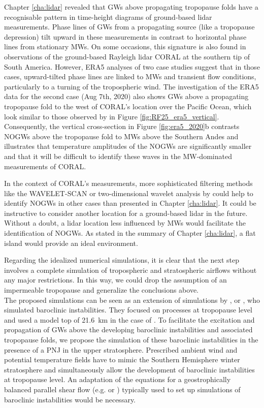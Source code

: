 Chapter \ref{cha:lidar} revealed that GWs above propagating tropopause folds have a recognisable pattern in time-height diagrams of ground-based lidar measurements. Phase lines of GWs from a propagating source (like a tropopause depression) tilt upward in these measurements in contrast to horizontal phase lines from stationary MWs. On some occasions, this signature is also found in observations of the ground-based Rayleigh lidar CORAL at the southern tip of South America. However, ERA5 analyses of two case studies suggest that in those cases, upward-tilted phase lines are linked to MWs and transient flow conditions, particularly to a turning of the tropospheric wind. The investigation of the ERA5 data for the second case (Aug 7th, 2020) also shows GWs above a propagating tropopause fold to the west of CORAL's location over the Pacific Ocean, which look similar to those observed by \textcite[]{dornbrack_stratospheric_2022} in Figure \ref{fig:RF25_era5_vertical}. Consequently, the vertical cross-section in Figure \ref{fig:era5_2020}b contrasts NOGWs above the tropopause fold to MWs above the Southern Andes and illustrates that temperature amplitudes of the NOGWs are significantly smaller and that it will be difficult to identify these waves in the MW-dominated measurements of CORAL.

In the context of CORAL's measurements, more sophisticated filtering methods like the WAVELET-SCAN or two-dimensional wavelet analysis by \textcite{reichert_highcadence_2021} could help to identify NOGWs in other cases than presented in Chapter \ref{cha:lidar}. It could be instructive to consider another location for a ground-based lidar in the future. Without a doubt, a lidar location less influenced by MWs would facilitate the identification of NOGWs. As stated in the summary of Chapter \ref{cha:lidar}, a flat island would provide an ideal environment.

Regarding the idealized numerical simulations, it is clear that the next step involves a complete simulation of tropospheric and stratospheric airflows without any major restrictions. In this way, we could drop the assumption of an impermeable tropopause and generalize the conclusions above.\\
The proposed simulations can be seen as an extension of simulations by \textcite{bush_tropopause_1994}, \textcite{zhang_generation_2004} or \textcite{menchaca_impact_2018}, who simulated baroclinic instabilities. They focused on processes at tropopause level and used a model top of \SI{21.6}{\kilo\meter} in the case of \textcite{zhang_generation_2004}. To facilitate the excitation and propagation of GWs above the developing baroclinic instabilities and associated tropopause folds, we propose the simulation of these baroclinic instabilities in the presence of a PNJ in the upper stratosphere. Prescribed ambient wind and potential temperature fields have to mimic the Southern Hemisphere winter stratosphere and simultaneously allow the development of baroclinic instabilities at tropopause level. An adaptation of the equations for a geostrophically balanced parallel shear flow (e.g. \cite[]{bush_tropopause_1994} or \cite{rotunno_analysis_1994}) typically used to set up simulations of baroclinic instabilities would be necessary.

